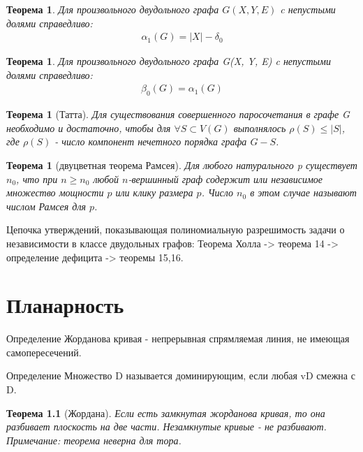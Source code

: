\documentclass[a4paper,openany]{book}
\newcounter{TheoremCounter}
\newtheorem{theorem}[TheoremCounter]{Теорема}
\newenvironment{definition}
{\begin{statement}{Определение}}
    {\end{statement}}
\begin{document}
\begin{theorem}
  Для произвольного двудольного графа $G(X, Y, E)$ c непустыми долями справедливо:
  \begin{align*}
    \alpha_1(G) = |X| - \delta_0
  \end{align*}
\end{theorem}

\begin{theorem}
  Для произвольного двудольного графа G(X, Y, E)  c непустыми долями справедливо:
  \begin{align*}
    \beta_0(G) = \alpha_1(G)
  \end{align*}
\end{theorem}

\begin{theorem}[Татта]
  Для существования совершенного паросочетания в графе G необходимо и
  достаточно, чтобы для $\forall S \subset V(G)$ выполнялось $\rho(S) \leqslant |S|$,
  где $\rho(S)$ - число компонент нечетного порядка графа $G-S$.
\end{theorem}

\begin{theorem}[двуцветная теорема Рамсея]
  Для любого натурального p существует $n_0$, что при $n \geqslant n_0$ любой
  $n$-вершинный граф содержит или независимое множество мощности $p$ или клику
  размера $p$. Число $n_0$ в этом случае называют числом Рамсея для $p$.
\end{theorem}

Цепочка утверждений, показывающая полиномиальную разрешимость задачи о независимости в классе двудольных графов:
Теорема Холла -> теорема 14 -> определение дефицита -> теоремы 15,16.




\chapter{Планарность}
\begin{definition}
  Жорданова кривая - непрерывная спрямляемая линия, не имеющая самопересечений.
\end{definition}

\begin{definition}
  Множество D называется доминирующим, если любая vD смежна с D.
\end{definition}

\begin{theorem}[Жордана]
  Если есть замкнутая жорданова кривая, то она разбивает плоскость на две части.
  Незамкнутые кривые - не разбивают. Примечание: теорема неверна для тора.
\end{theorem}
\end{document}
